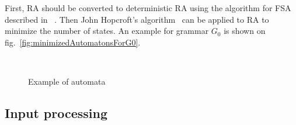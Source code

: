 \documentclass[runningheads,a4paper]{llncs}
\begin{document}
First, RA should be converted to deterministic RA using the algorithm for FSA described in ~\cite{aho1974design}.
Then John Hopcroft's algorithm~\cite{hopcroft1971n} can be applied to RA to minimize the number of states.
An example for grammar $G_0$ is shown on fig.~\ref{fig:minimizedAutomatonsForG0}.

\begin{figure}
    \centering
    ~
    ~
    \caption{Example of automata}
    \label{fig:fig1}
\end{figure}



\subsection{Input processing}%
\end{document}
